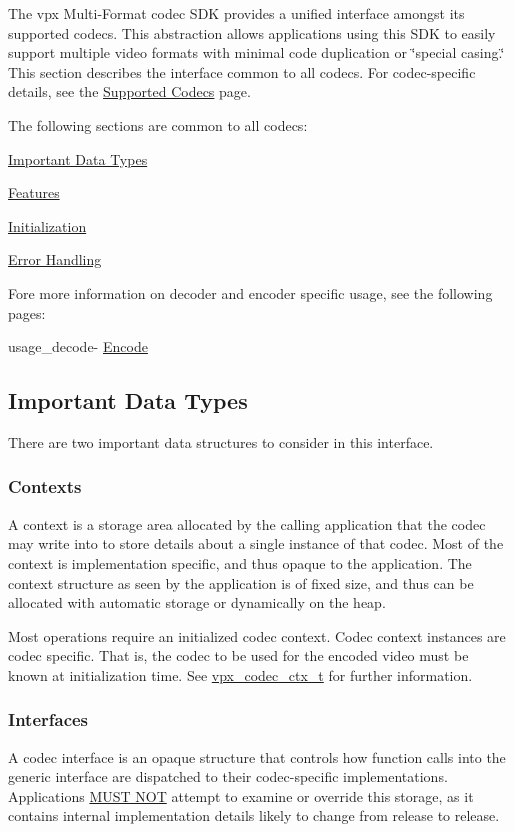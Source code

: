 \-The vpx \-Multi-\/\-Format codec \-S\-D\-K provides a unified interface amongst its supported codecs. \-This abstraction allows applications using this \-S\-D\-K to easily support multiple video formats with minimal code duplication or \char`\"{}special casing.\char`\"{} \-This section describes the interface common to all codecs. \-For codec-\/specific details, see the \hyperlink{group__codecs}{\-Supported \-Codecs} page.

\-The following sections are common to all codecs\-:
\begin{DoxyItemize}
\item \hyperlink{usage_usage_types}{\-Important \-Data \-Types}
\item \hyperlink{usage_usage_features}{\-Features}
\item \hyperlink{usage_usage_init}{\-Initialization}
\item \hyperlink{usage_usage_errors}{\-Error \-Handling}
\end{DoxyItemize}

\-Fore more information on decoder and encoder specific usage, see the following pages\-:
\begin{DoxyItemize}
\item usage\-\_\-decode-\/ \hyperlink{usage_encode}{\-Encode} 
\end{DoxyItemize}\hypertarget{usage_usage_types}{}\subsection{\-Important Data Types}\label{usage_usage_types}
\-There are two important data structures to consider in this interface.\hypertarget{usage_usage_ctxs}{}\subsubsection{\-Contexts}\label{usage_usage_ctxs}
\-A context is a storage area allocated by the calling application that the codec may write into to store details about a single instance of that codec. \-Most of the context is implementation specific, and thus opaque to the application. \-The context structure as seen by the application is of fixed size, and thus can be allocated with automatic storage or dynamically on the heap.

\-Most operations require an initialized codec context. \-Codec context instances are codec specific. \-That is, the codec to be used for the encoded video must be known at initialization time. \-See \hyperlink{group__codec_gad03e2dfa6ae511db7d25be6bbb336233}{vpx\-\_\-codec\-\_\-ctx\-\_\-t} for further information.\hypertarget{usage_usage_ifaces}{}\subsubsection{\-Interfaces}\label{usage_usage_ifaces}
\-A codec interface is an opaque structure that controls how function calls into the generic interface are dispatched to their codec-\/specific implementations. \-Applications \hyperlink{rfc2119_MUSTNOT}{\-M\-U\-S\-T \-N\-O\-T} attempt to examine or override this storage, as it contains internal implementation details likely to change from release to release.


